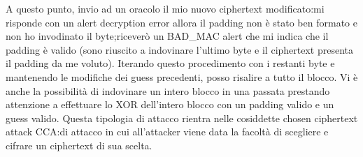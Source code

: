 \documentclass{article}
\begin{document}
A questo punto, invio ad un oracolo il mio nuovo ciphertext modificato:\@se mi risponde con un alert decryption error allora il padding non è stato ben formato e non ho invodinato il byte;\@altrimenti riceverò un BAD\_MAC alert che mi indica che il padding è valido (sono riuscito a indovinare l'ultimo byte e il ciphertext presenta il padding da me voluto). Iterando questo procedimento con i restanti byte e mantenendo le modifiche dei guess precedenti, posso risalire a tutto il blocco\@.\newline
Vi è anche la possibilità di indovinare un intero blocco in una passata prestando attenzione a effettuare lo XOR dell'intero blocco con un padding valido e un guess valido\@.\newline
Questa tipologia di attacco rientra nelle cosiddette chosen ciphertext attack CCA:\@schemi di attacco in cui all'attacker viene data la facoltà di scegliere e cifrare un ciphertext di sua scelta.
\end{document}
